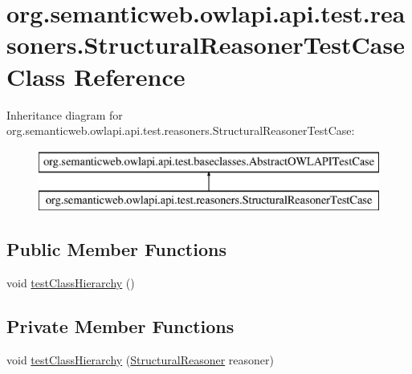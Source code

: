 \hypertarget{classorg_1_1semanticweb_1_1owlapi_1_1api_1_1test_1_1reasoners_1_1_structural_reasoner_test_case}{\section{org.\-semanticweb.\-owlapi.\-api.\-test.\-reasoners.\-Structural\-Reasoner\-Test\-Case Class Reference}
\label{classorg_1_1semanticweb_1_1owlapi_1_1api_1_1test_1_1reasoners_1_1_structural_reasoner_test_case}
}
Inheritance diagram for org.\-semanticweb.\-owlapi.\-api.\-test.\-reasoners.\-Structural\-Reasoner\-Test\-Case\-:\begin{figure}[H]
\begin{center}
\leavevmode
\includegraphics[height=2.000000cm]{classorg_1_1semanticweb_1_1owlapi_1_1api_1_1test_1_1reasoners_1_1_structural_reasoner_test_case}
\end{center}
\end{figure}
\subsection*{Public Member Functions}
\begin{DoxyCompactItemize}
\item 
void \hyperlink{classorg_1_1semanticweb_1_1owlapi_1_1api_1_1test_1_1reasoners_1_1_structural_reasoner_test_case_a4ab7ef2706563fb62b8029ff8199da3a}{test\-Class\-Hierarchy} ()
\end{DoxyCompactItemize}
\subsection*{Private Member Functions}
\begin{DoxyCompactItemize}
\item 
void \hyperlink{classorg_1_1semanticweb_1_1owlapi_1_1api_1_1test_1_1reasoners_1_1_structural_reasoner_test_case_a2decb4f6e68eb1155ebc8dec2a57edf6}{test\-Class\-Hierarchy} (\hyperlink{classorg_1_1semanticweb_1_1owlapi_1_1reasoner_1_1structural_1_1_structural_reasoner}{Structural\-Reasoner} reasoner)
\end{DoxyCompactItemize}
